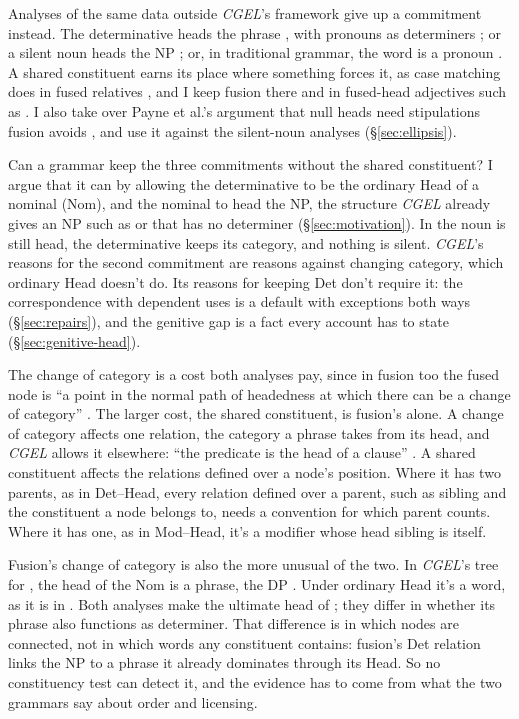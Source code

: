 \documentclass[12pt]{article}
\begin{document}
Analyses of the same data outside \textit{CGEL}'s framework give up a commitment instead. The determinative heads the phrase \citep{abney1987}, with pronouns as determiners \citep{postal1966}; or a silent noun heads the NP \citep{lobeck1995ellipsis,kester1996adjectival,panagiotidis2003empty,saab2019nominal}; or, in traditional grammar, the word is a pronoun \citep[419]{huddleston2002}. A shared constituent earns its place where something forces it, as case matching does in fused relatives \citep[576--579]{Payne2007}, and I keep fusion there and in fused-head adjectives such as . I also take over Payne et al.'s argument that null heads need stipulations fusion avoids \citep[571 n.~5, 584]{Payne2007}, and use it against the silent-noun analyses (§\ref{sec:ellipsis}).

Can a grammar keep the three commitments without the shared constituent? I argue that it can by allowing the determinative to be the ordinary Head of a nominal (Nom), and the nominal to head the NP, the structure \textit{CGEL} already gives an NP such as  or  that has no determiner (§\ref{sec:motivation}). In  the noun is still head, the determinative keeps its category, and nothing is silent. \textit{CGEL}'s reasons for the second commitment are reasons against changing category, which ordinary Head doesn't do. Its reasons for keeping Det don't require it: the correspondence with dependent uses is a default with exceptions both ways (§\ref{sec:repairs}), and the genitive gap is a fact every account has to state (§\ref{sec:genitive-head}).

The change of category is a cost both analyses pay, since in fusion too the fused node is \enquote{a point in the normal path of headedness at which there can be a change of category} \citep[569]{Payne2007}. The larger cost, the shared constituent, is fusion's alone. A change of category affects one relation, the category a phrase takes from its head, and \textit{CGEL} allows it elsewhere: \enquote{the predicate is the head of a clause} \citep[24]{huddleston2002}. A shared constituent affects the relations defined over a node's position. Where it has two parents, as in Det--Head, every relation defined over a parent, such as sibling and the constituent a node belongs to, needs a convention for which parent counts. Where it has one, as in Mod--Head, it's a modifier whose head sibling is itself.

Fusion's change of category is also the more unusual of the two. In \textit{CGEL}'s tree for , the head of the Nom is a phrase, the DP . Under ordinary Head it's a word, as it is in . Both analyses make  the ultimate head of ; they differ in whether its phrase also functions as determiner. That difference is in which nodes are connected, not in which words any constituent contains: fusion's Det relation links the NP to a phrase it already dominates through its Head. So no constituency test can detect it, and the evidence has to come from what the two grammars say about order and licensing.
\end{document}
